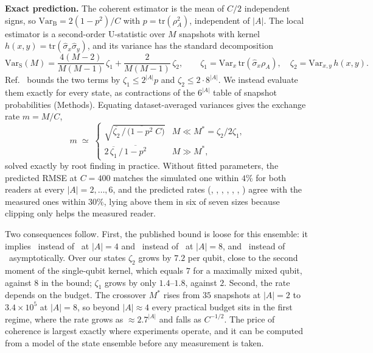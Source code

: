 \documentclass[11pt,a4paper]{article}
\begin{document}
\textbf{Exact prediction.} The coherent estimator is the mean of $C/2$ independent signs, so
$\mathrm{Var}_{\mathrm B}=2(1-p^2)/C$ with $p=\mathrm{tr}(\rho_A^2)$, independent of $|A|$. The local
estimator is a second-order U-statistic over $M$ snapshots with kernel
$h(x,y)=\mathrm{tr}(\hat\sigma_x\hat\sigma_y)$, and its variance has the standard decomposition
\citep{elben2020mixed}
\begin{equation}
\mathrm{Var}_{\mathrm S}(M)=\frac{4(M-2)}{M(M-1)}\,\zeta_1+\frac{2}{M(M-1)}\,\zeta_2,\qquad
\zeta_1=\mathrm{Var}_x\,\mathrm{tr}(\hat\sigma_x\rho_A),\quad \zeta_2=\mathrm{Var}_{x,y}\,h(x,y).
\label{eq:var}
\end{equation}
Ref.~ bounds the two terms by $\zeta_1\le2^{|A|}p$ and
$\zeta_2\le2\cdot8^{|A|}$. We instead evaluate them exactly for every state, as contractions of the
$6^{|A|}$ table of snapshot probabilities (Methods). Equating dataset-averaged variances gives the
exchange rate $m=M/C$,
\begin{equation}
m\;\simeq\;\begin{cases}
\sqrt{\overline{\zeta_2}\,/\,\big(\overline{1-p^2}\;C\big)} & M\ll M^\ast=\zeta_2/2\zeta_1,\\[0.3em]
2\,\overline{\zeta_1}\,/\,\overline{1-p^2} & M\gg M^\ast,
\end{cases}
\label{eq:rate}
\end{equation}
solved exactly by root finding in practice. Without fitted parameters, the predicted RMSE at
$C=400$ matches the simulated one within $4\%$ for both readers at every $|A|=2,\dots,6$, and the
predicted rates (\ExactTwo, \ExactThree, \ExactFour, \ExactFive, \ExactSix, \ExactSeven,
\ExactEight) agree with the measured ones within $30\%$, lying above them in six of seven sizes
because clipping only helps the measured reader.

Two consequences follow. First, the published bound is loose for this ensemble: it implies
\BoundFour\ instead of \ExactFour\ at $|A|=4$ and \BoundEight\ instead of \ExactEight\ at $|A|=8$, and
\BoundInfEight\ instead of \ExactInfEight\ asymptotically. Over our states $\zeta_2$ grows by $7.2$
per qubit, close to the second moment of the single-qubit kernel, which equals $7$ for a maximally
mixed qubit, against $8$ in the bound; $\zeta_1$ grows by only $1.4$--$1.8$, against $2$. Second,
the rate depends on the budget. The crossover $M^\ast$ rises from $35$ snapshots at $|A|=2$ to
$3.4\times10^{5}$ at $|A|=8$, so beyond $|A|\approx4$ every practical budget sits in the first
regime, where the rate grows as $\approx2.7^{|A|}$ and falls as $C^{-1/2}$. The price of coherence
is largest exactly where experiments operate, and it can be computed from a model of the state
ensemble before any measurement is taken.
\end{document}
